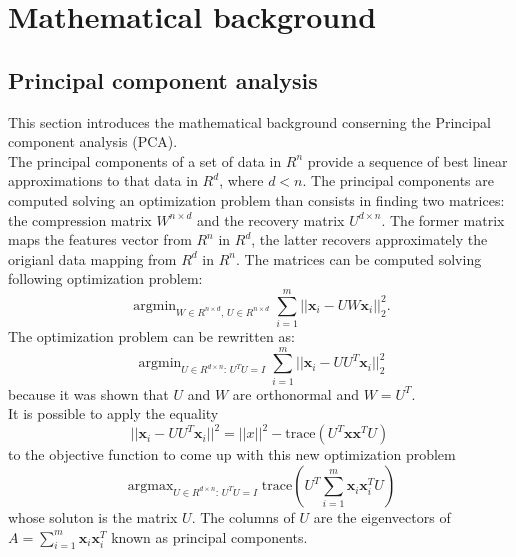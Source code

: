 \documentclass{article}
\DeclareMathOperator*{\argmax}{argmax}
\DeclareMathOperator*{\argmin}{argmin}
\begin{document}
\section{Mathematical background}
\subsection{Principal component analysis}
This section introduces the mathematical background conserning the Principal component analysis (PCA).\\
The principal components of a set of data in $R^n$ provide a sequence of best linear approximations to that data in $R^d$, where $d < n$.
The principal components are computed solving an optimization problem than consists in finding two matrices: the compression matrix $W^{n \times d}$ and  the recovery matrix $U^{d \times n}$. The former matrix maps the features vector from $R^n$ in $R^d$, the latter recovers approximately the origianl data mapping from $R^d$ in $R^n$.
The matrices can be computed solving following optimization problem:
\begin{equation}
\argmin_{W \in R^{n \times d}  , \, U \in R^{n \times d}} \sum_{i = 1}^m ||\textbf{x}_i -UW \textbf{x}_i ||_2^2.
\end{equation}
The optimization problem can be rewritten as:
\begin{equation}
\argmin_{U \in R^{d \times n}: \, U^TU=I} \sum_{i = 1}^m ||\textbf{x}_i -UU^T \textbf{x}_i ||_2^2
\end{equation}
because it was shown that $U$ and $W$ are orthonormal and $W = U^T$. \\
It is possible to apply the equality
\begin{equation}
||\textbf{x}_i -UU^T \textbf{x}_i ||^2 = ||x||^2 - \text{trace}(U^T\textbf{x}\textbf{x}^TU)
\end{equation}
to the objective function to come up with this new optimization problem
\begin{equation}
\argmax_{U \in R^{d \times n}: \, U^TU=I} \text{trace} (U^T\sum_{i=1}^m\textbf{x}_i\textbf{x}_i^T U)
\end{equation}
whose soluton is the matrix $U$. The columns of $U$ are the eigenvectors of $A = \sum_{i=1}^m\textbf{x}_i\textbf{x}_i^T$ known as principal components. \cite{book1} \cite{book2}
\end{document}

